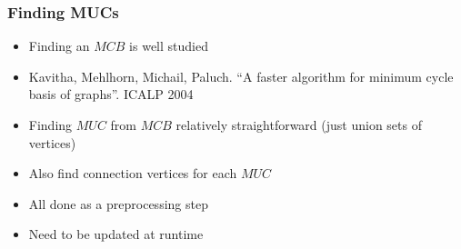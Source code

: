 \begin{frame}
  \frametitle{Finding MUCs}

  \begin{itemize}
    \item Finding an $MCB$ is well studied
    \item Kavitha, Mehlhorn, Michail, Paluch. ``A faster algorithm for minimum cycle basis of graphs''. ICALP 2004
    \item Finding $MUC$ from $MCB$ relatively straightforward (just union sets of vertices)
    \item Also find connection vertices for each $MUC$
    \item All done as a preprocessing step
    \item Need to be updated at runtime
  \end{itemize}
\end{frame}


